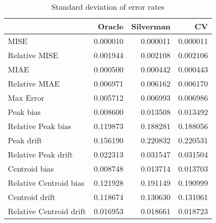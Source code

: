 \begin{table}[ht]
\centering
\begin{tabular}{lrrr}
  \hline
 & Oracle & Silverman & CV \\ 
  \hline
MISE & 0.000010 & 0.000011 & 0.000011 \\ 
  Relative MISE & 0.001944 & 0.002108 & 0.002106 \\ 
  MIAE & 0.000500 & 0.000442 & 0.000443 \\ 
  Relative MIAE & 0.006971 & 0.006162 & 0.006170 \\ 
  Max Error & 0.005712 & 0.006993 & 0.006986 \\ 
  Peak bias & 0.008600 & 0.013508 & 0.013492 \\ 
  Relative Peak bias & 0.119873 & 0.188281 & 0.188056 \\ 
  Peak drift & 0.156190 & 0.220832 & 0.220531 \\ 
  Relative Peak drift & 0.022313 & 0.031547 & 0.031504 \\ 
  Centroid bias & 0.008748 & 0.013714 & 0.013703 \\ 
  Relative Centroid bias & 0.121928 & 0.191149 & 0.190999 \\ 
  Centroid drift & 0.118674 & 0.130630 & 0.131061 \\ 
  Relative Centroid drift & 0.016953 & 0.018661 & 0.018723 \\ 
   \hline
\end{tabular}
\caption{Standard deviation of error rates} 
\label{tbl:stddev_error_rates}
\end{table}
